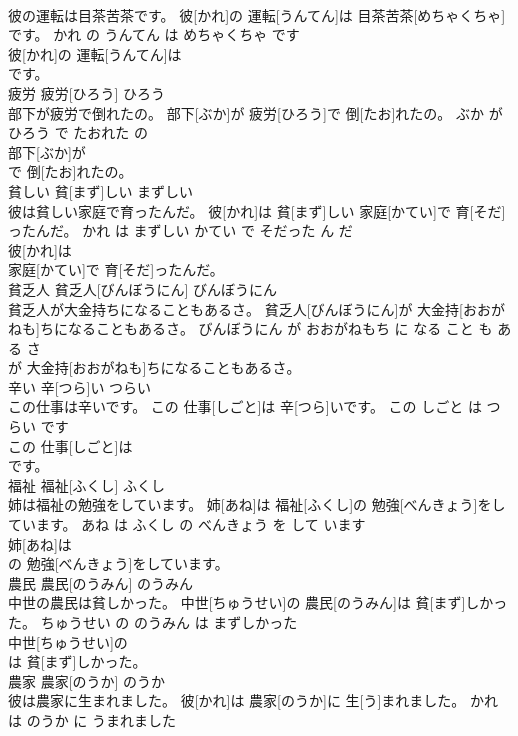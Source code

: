 \documentclass[8pt]{extreport}
\begin{document}
\begin{CJK}{UTF8}{min}
\\	彼の運転は目茶苦茶です。	彼[かれ]の 運転[うんてん]は 目茶苦茶[めちゃくちゃ]です。	かれ の うんてん は めちゃくちゃ です	
\\	彼[かれ]の 運転[うんてん]は
\\	です。			
\\	疲労	疲労[ひろう]	ひろう	
\\	部下が疲労で倒れたの。	部下[ぶか]が 疲労[ひろう]で 倒[たお]れたの。	ぶか が ひろう で たおれた の	
\\	部下[ぶか]が
\\	で 倒[たお]れたの。			
\\	貧しい	貧[まず]しい	まずしい	
\\	彼は貧しい家庭で育ったんだ。	彼[かれ]は 貧[まず]しい 家庭[かてい]で 育[そだ]ったんだ。	かれ は まずしい かてい で そだった ん だ	
\\	彼[かれ]は
\\	家庭[かてい]で 育[そだ]ったんだ。			
\\	貧乏人	貧乏人[びんぼうにん]	びんぼうにん	
\\	貧乏人が大金持ちになることもあるさ。	貧乏人[びんぼうにん]が 大金持[おおがねも]ちになることもあるさ。	びんぼうにん が おおがねもち に なる こと も ある さ	
\\	が 大金持[おおがねも]ちになることもあるさ。			
\\	辛い	辛[つら]い	つらい	
\\	この仕事は辛いです。	この 仕事[しごと]は 辛[つら]いです。	この しごと は つらい です	
\\	この 仕事[しごと]は
\\	です。			
\\	福祉	福祉[ふくし]	ふくし	
\\	姉は福祉の勉強をしています。	姉[あね]は 福祉[ふくし]の 勉強[べんきょう]をしています。	あね は ふくし の べんきょう を して います	
\\	姉[あね]は
\\	の 勉強[べんきょう]をしています。			
\\	農民	農民[のうみん]	のうみん	
\\	中世の農民は貧しかった。	中世[ちゅうせい]の 農民[のうみん]は 貧[まず]しかった。	ちゅうせい の のうみん は まずしかった	
\\	中世[ちゅうせい]の
\\	は 貧[まず]しかった。			
\\	農家	農家[のうか]	のうか	
\\	彼は農家に生まれました。	彼[かれ]は 農家[のうか]に 生[う]まれました。	かれ は のうか に うまれました	

\end{CJK}
\end{document}

